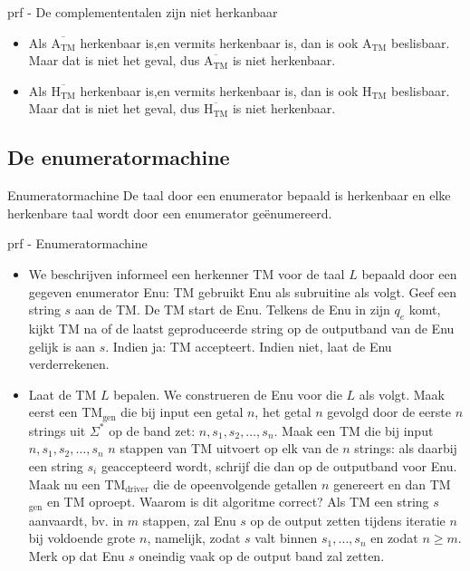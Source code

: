 \begin{prf}{prf - De complemententalen zijn niet herkanbaar}
    \begin{itemize}
        \item 
            Als $\overline{\text{A}_{\text{TM}}}$ herkenbaar is,en vermits herkenbaar is, dan is ook $\text{A}_{\text{TM}}$ beslisbaar. Maar dat is niet het geval, dus $\overline{\text{A}_{\text{TM}}}$ is niet herkenbaar.
        \item 
            Als $\overline{\text{H}_{\text{TM}}}$ herkenbaar is,en vermits herkenbaar is, dan is ook $\text{H}_{\text{TM}}$ beslisbaar. Maar dat is niet het geval, dus $\overline{\text{H}_{\text{TM}}}$ is niet herkenbaar.
    \end{itemize}
\end{prf}

\newpage

\subsection{De enumeratormachine}

\vspace{0.5cm}

\begin{lem}[Enumeratormachine]{Enumeratormachine}
    De taal door een enumerator bepaald is herkenbaar en elke herkenbare taal wordt door een enumerator geënumereerd.
\end{lem}

\begin{prf}[Enumeratormachine]{prf - Enumeratormachine}
    \begin{itemize}
        \item 
            We beschrijven informeel een herkenner TM voor de taal $L$ bepaald door een gegeven enumerator Enu: TM gebruikt Enu als subruitine als volgt. Geef een string $s$ aan de TM\@. De TM start de Enu. Telkens de Enu in zijn $q_e$ komt, kijkt TM na of de laatst geproduceerde string op de outputband van de Enu gelijk is aan $s$. Indien ja: TM accepteert. Indien niet, laat de Enu verderrekenen.
        \item 
            Laat de TM $L$ bepalen. We construeren de Enu voor die $L$ als volgt. Maak eerst een TM$_{\text{gen}}$ die bij input een getal $n$, het getal $n$ gevolgd door de eerste $n$ strings uit $\Sigma^*$ op de band zet: $n, s_1, s_2, \dots, s_n$. Maak een TM die bij input $n, s_1, s_2, \dots, s_n$ $n$ stappen van TM uitvoert op elk van de $n$ strings: als daarbij een string $s_i$ geaccepteerd wordt, schrijf die dan op de outputband voor Enu. Maak nu een TM$_{\text{driver}}$ die de opeenvolgende getallen $n$ genereert en dan TM$_{\text{gen}}$ en TM oproept.
            Waarom is dit algoritme correct? Als TM een string $s$ aanvaardt, bv\@. in $m$ stappen, zal Enu $s$ op de output zetten tijdens iteratie $n$ bij voldoende grote $n$, namelijk, zodat $s$ valt binnen $s_1,\ldots,s_n$ en zodat $n \geq m$. Merk op dat Enu $s$ oneindig vaak op de output band zal zetten.
    \end{itemize}
\end{prf}

